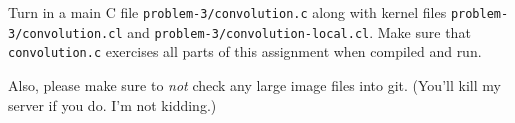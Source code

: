 Turn in a main C file \texttt{problem-3/convolution.c} along with
kernel files \texttt{problem-3/convolution.cl} and
\texttt{problem-3/convolution-local.cl}. Make sure that
\texttt{convolution.c} exercises all parts of this assignment when
compiled and run.

Also, please make sure to \emph{not} check any large image files
into git. (You'll kill my server if you do. I'm not kidding.)


